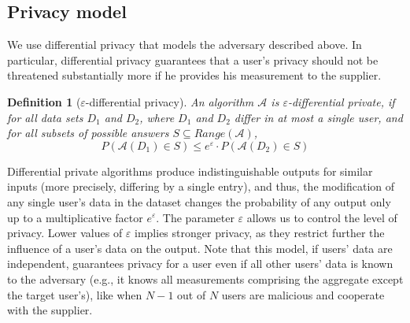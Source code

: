 \documentclass[11pt,a4paper]{article}
\theoremstyle{plain}
\newtheorem{definition}{Definition}
\theoremstyle{plain}
\theoremstyle{plain}
\theoremstyle{plain}
\theoremstyle{nonumberplain} \theoremseparator{}
\begin{document}
\subsection{Privacy model}
We use differential privacy \cite{dwork06tcc} that models the adversary described above. 
In particular, differential privacy guarantees that a user's privacy should not be threatened substantially more if he provides his measurement to the supplier. 

\begin{definition}[$\varepsilon$-differential privacy]
\label{def:diff_priv_stand}
An algorithm $\mathcal{A}$ is $\varepsilon$-differential private, if for all
data sets $D_{1}$ and $D_{2}$, where $D_{1}$ and $D_{2}$ differ in at most a single user,
and for all subsets of possible answers $S \subseteq \mathit{Range}(\mathcal{A})$,
$$
P(\mathcal{A}(D_{1}) \in S) \leq e^{\varepsilon} \cdot P(\mathcal{A}(D_{2}) \in S) 
$$
\end{definition}

Differential private algorithms produce indistinguishable outputs for similar inputs (more precisely, differing by a single entry), and thus, the modification of any single user's data in the dataset changes the probability of any output only up to a multiplicative factor $e^\varepsilon$. The parameter $\varepsilon$ allows us to control the level of privacy. Lower values of $\varepsilon$ implies stronger privacy, as they restrict further the influence of a user's data on the output. 
Note that this model, if users' data are independent, guarantees privacy for a user even if all other users' data is known to the adversary (e.g., it knows all measurements comprising the aggregate except the target user's), like when $N-1$ out of $N$ users are malicious and cooperate with the supplier. 
\end{document}
